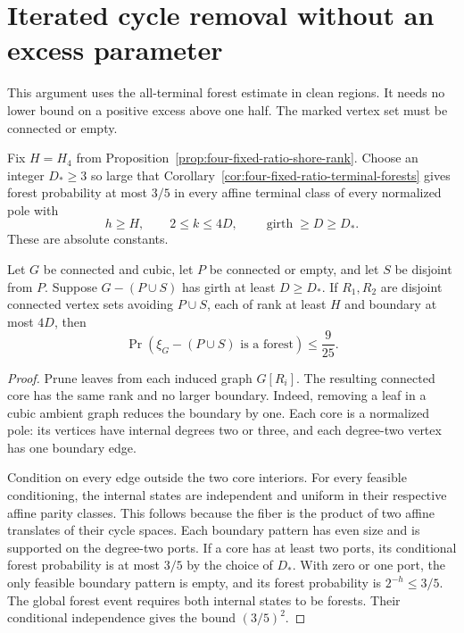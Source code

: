 \section{Iterated cycle removal without an excess parameter}
\label{sec:four-iterative-packing}

This argument uses the all-terminal forest estimate in clean regions.
It needs no lower bound on a positive excess above one half.
The marked vertex set must be connected or empty.

Fix $H=H_4$ from Proposition~\ref{prop:four-fixed-ratio-shore-rank}.
Choose an integer $D_*\ge3$ so large that Corollary~\ref{cor:four-fixed-ratio-terminal-forests} gives forest probability at most $3/5$ in every affine terminal class of every normalized pole with
\[
 h\ge H,\qquad 2\le k\le4D,\qquad \operatorname{girth}\ge D\ge D_*.
\]
These are absolute constants.

\begin{lemma}
\label{lem:four-two-clean-regions}
Let $G$ be connected and cubic, let $P$ be connected or empty, and let $S$ be disjoint from $P$.
Suppose $G-(P\cup S)$ has girth at least $D\ge D_*$.
If $R_1,R_2$ are disjoint connected vertex sets avoiding $P\cup S$, each of rank at least $H$ and boundary at most $4D$, then
\[
 \Pr(\xi_G-(P\cup S)\text{ is a forest})\le\frac9{25}.
\]
\end{lemma}

\begin{proof}
Prune leaves from each induced graph $G[R_i]$.
The resulting connected core has the same rank and no larger boundary.
Indeed, removing a leaf in a cubic ambient graph reduces the boundary by one.
Each core is a normalized pole: its vertices have internal degrees two or three, and each degree-two vertex has one boundary edge.

Condition on every edge outside the two core interiors.
For every feasible conditioning, the internal states are independent and uniform in their respective affine parity classes.
This follows because the fiber is the product of two affine translates of their cycle spaces.
Each boundary pattern has even size and is supported on the degree-two ports.
If a core has at least two ports, its conditional forest probability is at most $3/5$ by the choice of $D_*$.
With zero or one port, the only feasible boundary pattern is empty, and its forest probability is $2^{-h}\le3/5$.
The global forest event requires both internal states to be forests.
Their conditional independence gives the bound $(3/5)^2$.
\end{proof}

